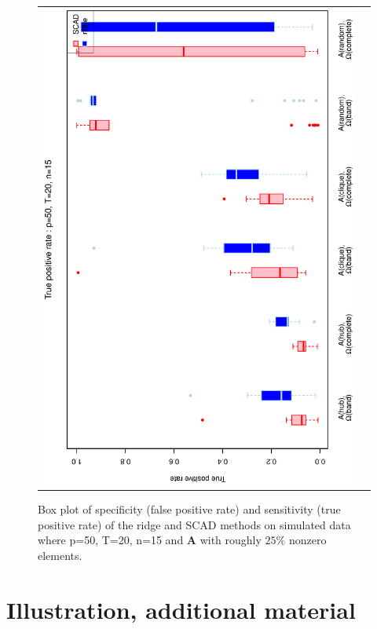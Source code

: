 \begin{figure}[h!]
\begin{tabular}{cc}
\includegraphics[scale=0.45,angle=270]{ROCtpr50T20N15_25.eps}
\end{tabular}
\caption{Box plot of specificity (false positive rate) and sensitivity (true positive rate) of the ridge and SCAD methods on simulated data where p=50, T=20, n=15 and $\mathbf{A}$ with roughly $25\%$ nonzero elements.}
\label{figSM:RocP50T20N15_25}
\end{figure}


\afterpage{\clearpage}

%

\newpage
\section{Illustration, additional material }

